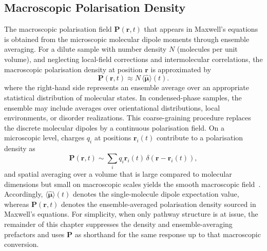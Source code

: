 \subsection{Macroscopic Polarisation Density}
The macroscopic polarisation field $\boldsymbol{P}(\boldsymbol{r},t)$ that appears in Maxwell's equations is obtained from the microscopic molecular dipole moments through ensemble averaging.
For a dilute sample with number density $N$ (molecules per unit volume), and neglecting local-field corrections and intermolecular correlations, the macroscopic polarisation density at position $\boldsymbol{r}$ is approximated by~\cite{mancal2022nonlinearopticalspectroscopy}
\begin{equation}
	\boldsymbol{P}(\boldsymbol{r},t)
	\approx N\,\langle\hat{\boldsymbol{\mu}}\rangle(t).
	\label{eq:spctr_P_macroscopic_from_micro}
\end{equation}
where the right-hand side represents an ensemble average over an appropriate statistical distribution of molecular states.
In condensed-phase samples, the ensemble may include averages over orientational distributions, local environments, or disorder realizations.
This coarse-graining procedure replaces the discrete molecular dipoles by a continuous polarisation field. On a microscopic level, charges $q_i$ at positions $\boldsymbol{r}_i(t)$ contribute to a polarisation density as
\begin{equation*}
	\boldsymbol{P}(\boldsymbol{r}, t)
		\sim \sum_i q_i \boldsymbol{r}_i(t)\, \delta(\boldsymbol{r} - \boldsymbol{r}_i(t)),
\end{equation*}
and spatial averaging over a volume that is large compared to molecular dimensions but small on macroscopic scales yields the smooth macroscopic field~\cite{mancal2022nonlinearopticalspectroscopy}.
Accordingly, $\langle\hat{\boldsymbol{\mu}}\rangle(t)$ denotes the single-molecule dipole expectation value, whereas $\boldsymbol{P}(\boldsymbol{r},t)$ denotes the ensemble-averaged polarisation density sourced in Maxwell's equations. For simplicity, when only pathway structure is at issue, the remainder of this chapter suppresses the density and ensemble-averaging prefactors and uses $\boldsymbol{P}$ as shorthand for the same response up to that macroscopic conversion.

